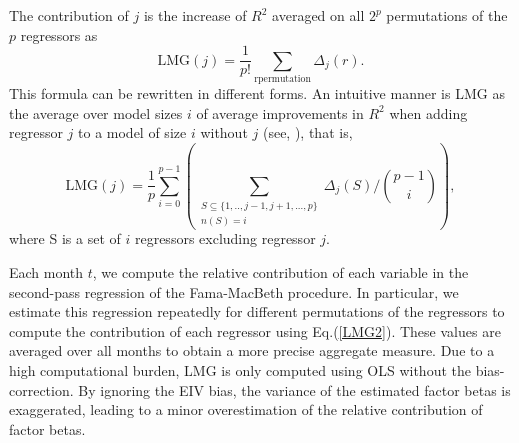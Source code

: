 The contribution of $j$ is the increase of $R^2$ averaged on all $2^p$ permutations of the $p$ regressors as 
\begin{equation}
    \label{LMG1} 
    \text{LMG}(j) = \frac{1}{p!} \sum_{\text{rpermutation}} \Delta_j(r).
\end{equation}
This formula can be rewritten in different forms. An intuitive manner is LMG as the average over model sizes $i$ of average improvements in $R^2$ when adding regressor $j$ to a model of size $i$
without $j$ (see, \citet{christensen1992comment}), that is,
\begin{equation}
    \label{LMG2}
      \text{LMG}(j) = \frac{1}{p} \sum^{p-1}_{i=0} \left(\sum_{\substack{S \subseteq \{1,..,j-1,j+1,...,p\} \\  n(S) = i}} \Delta_j(S) \bigg/ {p-1\choose i}  \right), 
\end{equation}
where S is a set of $i$ regressors excluding regressor $j$. 
\par Each month $t$, we compute the relative contribution of each variable in the second-pass regression of the Fama-MacBeth procedure. In particular, we estimate this regression repeatedly for different permutations of the regressors to compute the contribution of each regressor using Eq.(\ref{LMG2}). These values are averaged over all months to obtain a more precise aggregate measure. Due to a high computational burden, LMG is only computed using OLS without the bias-correction. By ignoring the EIV bias, the variance of the estimated factor betas is exaggerated, leading to a minor overestimation of the relative contribution of factor betas. 


